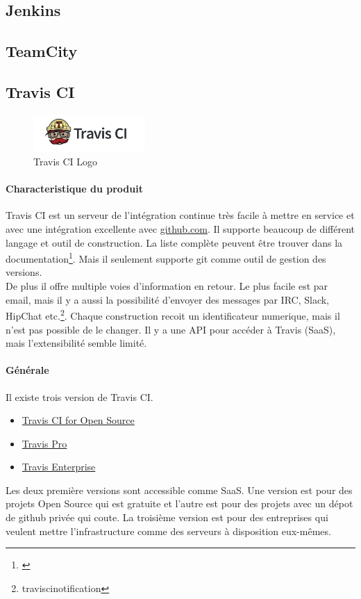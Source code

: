 \subsection{Jenkins}

\subsection{TeamCity}
\newpage
\subsection{Travis CI}
\begin{figure}
  \begin{center}
    \includegraphics[width=0.38\textwidth]{bilder/Travis-CI-logo}
  \end{center}
  \caption{Travis CI Logo}
\end{figure}
\paragraph{Characteristique du produit}
Travis CI est un serveur de l'intégration continue très facile à mettre en service et avec une intégration excellente avec \href{https://github.com/}{github.com}. Il supporte beaucoup de différent langage et outil de construction. La liste complète peuvent être trouver dans la documentation\footnote{\citep{traviscidocs}}. Mais il seulement supporte git comme outil de gestion des versions.\\
De plus il offre multiple voies d'information en retour. Le plus facile est par email, mais il y a aussi la possibilité d'envoyer des messages par IRC, Slack, HipChat etc.\footnote{traviscinotification}. Chaque construction recoit un identificateur numerique, mais il n'est pas possible de le changer. Il y a une API pour accéder à Travis (SaaS), mais l'extensibilité semble limité.

\paragraph{Générale}
Il existe trois version de Travis CI.
\begin{itemize}
	\item \href{https://travis-ci.org/}{Travis CI for Open Source}
	\item \href{https://travis-ci.com/}{Travis Pro}
	\item \href{https://enterprise.travis-ci.com/}{Travis Enterprise}
\end{itemize}
Les deux première versions sont accessible comme SaaS. Une version est pour des projets Open Source qui est gratuite et l'autre est pour des projets avec un dépot de github privée qui coute. La troisième version est pour des entreprises qui veulent mettre l'infrastructure comme des serveurs à disposition eux-mêmes.

